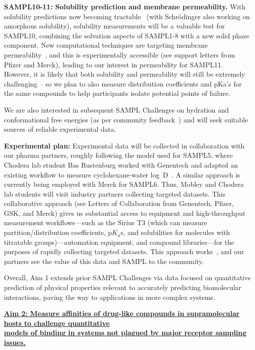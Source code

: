 \documentclass[11pt]{article}
\begin{document}
\textbf{SAMPL10-11: Solubility prediction and membrane permeability.}
With solubility predictions now becoming tractable~\cite{Schnieders:2012:J.Chem.TheoryComput., park_absolute_2014, liu_using_2016} (with Schr\"{o}dinger also working on amorphous solubility), solubility measurements will be a valuable test for SAMPL10, combining the solvation aspects of SAMPL1-8 with a new solid phase component.
New computational techniques are targeting membrane permeability~\cite{lee_permeability_2016, comer_permeability_2014}, and this is experimentally accessible (see support letters from Pfizer and Merck), leading to our interest in permeability for SAMPL11.
However, it is likely that both solubility and permeability will still be extremely challenging -- so we plan to also measure distribution coefficients and pKa's for the same compounds to help participants isolate potential points of failure.

We are also interested in subsequent SAMPL Challenges on hydration and conformational free energies (as per community feedback~\cite{Mobley:2017:eScholarship}) and will seek suitable sources of reliable experimental data.

{\bf Experimental plan:}
Experimental data will be collected in collaboration with our pharma partners, roughly following the model used for SAMPL5, where Chodera lab student Bas Rustenburg worked with Genentech and adapted an existing workflow to measure cyclohexane-water log~D~\cite{rustenburg_measuring_2016}.
A similar approach is currently being employed with Merck for SAMPL6.
Thus, Mobley and Chodera lab students will visit industry partners collecting targeted datasets.
This collaborative approach (see Letters of Collaboration from Genentech, Pfizer, GSK, and Merck) gives us substantial access to equipment and high-throughput measurement workflows---such as the Sirius T3 (which can measure partition/distribution coefficients, p$K_a$s, and solubilities for molecules with titratable groups)---automation equipment, and compound libraries---for the purposes of rapidly collecting targeted datasets.
This approach works~\cite{rustenburg_measuring_2016}, and our partners see the value of this data and SAMPL to the community.

Overall, Aim 1 extends prior SAMPL Challenges via data focused on quantitative prediction of physical properties relevant to accurately predicting biomolecular interactions, paving the way to applications in more complex systems.


\textbf{\underline{Aim 2: Measure affinities of drug-like compounds in supramolecular hosts to challenge quantitative}}\\
\textbf{\underline{models of binding in systems not plagued by major receptor sampling issues.}}
\end{document}
